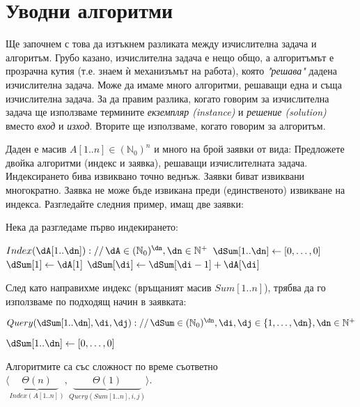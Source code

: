 \section{Уводни алгоритми}

Ще започнем с това да изтъкнем разликата между изчислителна задача и алгоритъм. Грубо казано, изчислителна задача е нещо общо, а алгоритъмът е прозрачна кутия (т.е. знаем ѝ механизъмът на работа), която \emph{"решава"} дадена изчислителна задача. Може да имаме много алгоритми, решаващи една и съща изчислителна задача. За да правим разлика, когато говорим за изчислителна задача ще използваме термините \emph{екземпляр (instance)} и \emph{решение (solution)} вместо \emph{вход} и \emph{изход}. Вторите ще използваме, когато говорим за алгоритъм.\\

\begin{problem}
	Даден е масив $A[1..n]\in(\mathbb{N}_0)^n$ и много на брой заявки от вида:
	Предложете двойка алгоритми (индекс и заявка), решаващи изчислителната задача. Индексирането бива извиквано точно веднъж. Заявки биват извиквани многократно. Заявка не може бъде извикана преди (единственото) извикване на индекса. Разгледайте следния пример, имащ две заявки:
\end{problem}

\begin{solution}
	Нека да разгледаме първо индекирането:
	\begin{pseudocode}
		
		$Index(\dA[1..\dn])://\,\dA\in(\mathbb{N}_0)^{\dn},\dn\in\mathbb{N}^+$
		\Mybegin
		{
			$\dSum[1..\dn]\leftarrow[0,\dots,0]$\;
			$\dSum[1]\leftarrow\dA[1]$\;
			{
				$\dSum[\di]\leftarrow\dSum[\di-1]+\dA[\di]$\;
			}
			\KwRet{$\dSum[1..\dn]$}\;
		}
	\end{pseudocode}
	След като направихме индекс (връщаният масив $Sum[1..n]$), трябва да го използваме по подходящ начин в заявката:
	\begin{pseudocode}
		\SetKwData{dn}{n}
		\SetKwData{dSum}{Sum}
		\SetKwData{di}{i}
		\SetKwData{dj}{j}
		
		$Query(\dSum[1..\dn],\di,\dj)://\,\dSum\in(\mathbb{N}_0)^{\dn},\di,\dj\in\{1,\dots,\dn\},\dn\in\mathbb{N}^+$
		\Mybegin
		{
			$\dSum[1..\dn]\leftarrow[0,\dots,0]$\;
			
			\If{$\di<1$ \Or $\dj>\dn$}{\KwRet{$-1$};}
			\If{$\di>\dj$}{\KwRet{$0$};}
			\If{$\di=1$}{\KwRet{$\dSum[\dj]$};}
			
			\KwRet{$\dSum[\dj]-\dSum[\di-1]$}\;
		}
	\end{pseudocode}
	Алгоритмите са със сложност по време съответно $\langle\underbrace{\ \ \ \Theta(n)\ \ \ }_{Index(A[1..n])},\underbrace{\quad\quad\Theta(1)\quad\quad}_{Query(Sum[1..n],i,j)}\rangle$.
\end{solution}\vspace{0.5cm}

